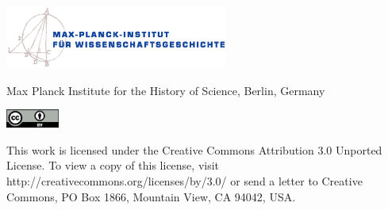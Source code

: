 \includegraphics[width=0.55\textwidth]{bilder/misc/MPIWG_d_WM_4c.eps}
\vspace{20mm}
\maketitle

\begin{center}

\normalsize Max Planck Institute for the History of Science, Berlin, Germany

\end{center}

\vfill
\noindent\includegraphics[width=0.13\textwidth]{bilder/misc/by.eps}

\noindent
This work is licensed under the Creative Commons Attribution 3.0 Unported License. To view a copy of this license, visit http://creativecommons.org/licenses/by/3.0/ or send a letter to Creative Commons, PO Box 1866, Mountain View, CA 94042, USA.


